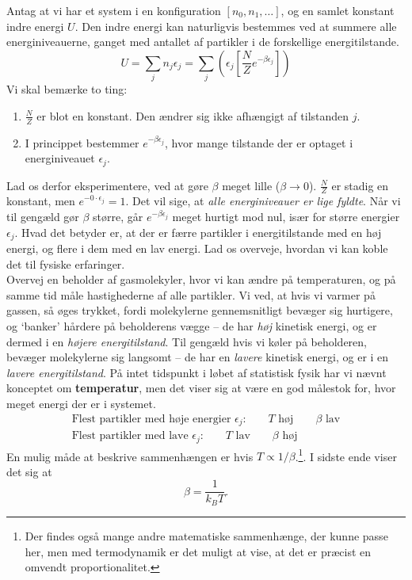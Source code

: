Antag at vi har et system i en konfiguration $[n_0,n_1,\dots]$, og en samlet konstant indre energi $U$. Den indre energi kan naturligvis bestemmes ved at summere alle energiniveauerne, ganget med antallet af partikler i de forskellige energitilstande.
\[ U=\sum_j n_j\epsilon_j=\sum_j\left( \epsilon_j \left[\frac{N}{Z}e^{-\beta\epsilon_j}\right]\right) \]
Vi skal bemærke to ting:
\begin{enumerate}
    \item $\frac{N}{Z}$ er blot en konstant. Den ændrer sig ikke afhængigt af tilstanden $j$.
    \item I princippet bestemmer $e^{-\beta\epsilon_j}$, hvor mange tilstande der er optaget i energiniveauet $\epsilon_j$.
\end{enumerate}
Lad os derfor eksperimentere, ved at gøre $\beta$ meget lille ($\beta\to 0$). $\frac{N}{Z}$ er stadig en konstant, men $e^{-0\cdot\epsilon_j}=1$. Det vil sige, at \emph{alle energiniveauer er lige fyldte}. Når vi til gengæld gør $\beta$ større, går $e^{-\beta\epsilon_j}$ meget hurtigt mod nul, især for større energier $\epsilon_j$. Hvad det betyder er, at der er færre partikler i energitilstande med en høj energi, og flere i dem med en lav energi. Lad os overveje, hvordan vi kan koble det til fysiske erfaringer.\\[12pt]
Overvej en beholder af gasmolekyler, hvor vi kan ændre på temperaturen, og på samme tid måle hastighederne af alle partikler. Vi ved, at hvis vi varmer på gassen, så øges trykket, fordi molekylerne gennemsnitligt bevæger sig hurtigere, og `banker' hårdere på beholderens vægge -- de har \emph{høj} kinetisk energi, og er dermed i en \emph{højere energitilstand}. Til gengæld hvis vi køler på beholderen, bevæger molekylerne sig langsomt -- de har en \emph{lavere} kinetisk energi, og er i en \emph{lavere energitilstand}. På intet tidspunkt i løbet af statistisk fysik har vi nævnt konceptet om \textbf{temperatur}, men det viser sig at være en god målestok for, hvor meget energi der er i systemet.
\begin{align*}
    \text{Flest partikler med høje energier $\epsilon_j$:} \qquad T\text{ høj}\qquad \beta\text{ lav}\\
    \text{Flest partikler med lave $\epsilon_j$:}\qquad T\text{ lav}\qquad \beta\text{ høj}
\end{align*}
En mulig måde at beskrive sammenhængen er hvis $T\propto 1/\beta$.\footnote{Der findes også mange andre matematiske sammenhænge, der kunne passe her, men med termodynamik er det muligt at vise, at det er præcist en omvendt proportionalitet.}. I sidste ende viser det sig at
\begin{equation}
    \beta =\frac{1}{k_BT}.
\end{equation}

